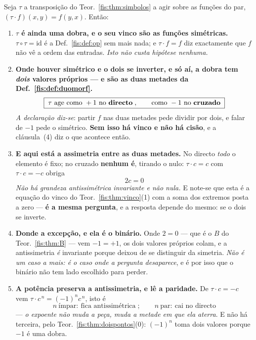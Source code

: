 \documentclass[livro.tex]{subfiles}
\begin{document}
\begin{teorema}\label{fis:thm:antissim}
Seja $\tau$ a transposição do Teor.~\ref{fis:thm:simbolos} a agir sobre as
funções do par, $(\tau\!\cdot\! f)(x,y)=f(y,x)$. Então:
\begin{enumerate}\itemsep3pt
\item[(1)] \textbf{$\tau$ é ainda uma dobra, e o seu vinco são as funções
simétricas.} $\tau\circ\tau=\mathrm{id}$ é a Def.~\ref{fis:def:op} sem mais nada;
e $\tau\!\cdot\! f=f$ diz exactamente que $f$ não vê a ordem das entradas.
\emph{Isto não custa hipótese nenhuma.}
\item[(2)] \textbf{Onde houver simétrico e o dois se inverter, e só aí, a dobra
tem \emph{dois} valores próprios --- e são as duas metades da
Def.~\ref{fis:def:duomorf}.}
\[
\boxed{\;\tau\ \text{age como}\ +1\ \text{no \textbf{directo}}\;,\qquad
\text{como}\ -1\ \text{no \textbf{cruzado}}\;}
\]
\emph{A declaração diz-se}: partir $f$ nas duas metades pede dividir por dois, e
falar de $-1$ pede o simétrico. \textbf{Sem isso há vinco e não há cisão}, e a
cláusula~(4) diz o que acontece então.
\item[(3)] \textbf{E aqui está a assimetria entre as duas metades.} No directo
\emph{todo} o elemento é fixo; no cruzado \textbf{nenhum é}, tirando o nulo:
$\tau\!\cdot\! c=c$ com $\tau\!\cdot\! c=-c$ obriga
\[
\boxed{\;2c=0\;}
\]
\emph{Não há grandeza antissimétrica invariante e não nula.} E note-se que esta é
a equação do vinco do Teor.~\ref{fis:thm:vinco}(1) com a soma dos extremos posta
a zero --- \textbf{é a mesma pergunta}, e a resposta depende do mesmo: se o dois
se inverte.
\item[(4)] \textbf{Donde a excepção, e ela é o binário.} Onde $2=0$ --- que é o
$B$ do Teor.~\ref{fis:thm:B} --- vem $-1=+1$, os dois valores próprios colam, e
a antissimetria \emph{é} invariante porque deixou de se distinguir da simetria.
\emph{Não é um caso a mais: é o caso onde a pergunta desaparece}, e é por isso
que o binário não tem lado escolhido para perder.
\item[(5)] \textbf{A potência preserva a antissimetria, e lê a paridade.} De
$\tau\!\cdot\! c=-c$ vem $\tau\!\cdot\! c^{\,n}=(-1)^{n}c^{\,n}$, isto é
\[
\boxed{\;n\ \text{ímpar}:\ \text{fica antissimétrica}\;;\qquad
n\ \text{par}:\ \text{cai no directo}\;}
\]
--- \emph{o expoente não muda a peça, muda a metade em que ela aterra}. E não há
terceira, pelo Teor.~\ref{fis:thm:doispontos}(0): $(-1)^{n}$ toma dois valores
porque $-1$ é uma dobra.

\end{enumerate}
\end{teorema}
\end{document}
